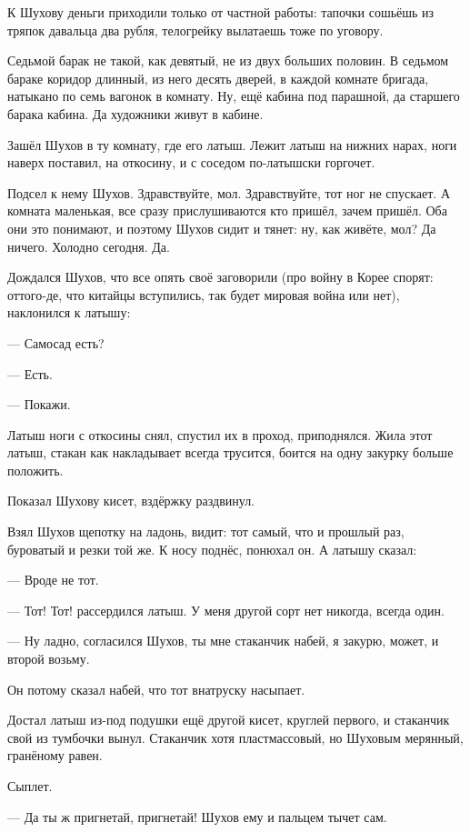 К Шухову деньги приходили только от частной работы: тапочки сошьёшь из тряпок давальца \dash
два рубля, телогрейку вылатаешь \dash тоже по уговору.

Седьмой барак не такой, как девятый, не из двух больших половин. В седьмом бараке коридор
длинный, из него десять дверей, в каждой комнате бригада, натыкано по семь вагонок в комнату.
Ну, ещё кабина под парашной, да старшего барака кабина. Да художники живут в кабине.

Зашёл Шухов в ту комнату, где его латыш. Лежит латыш на нижних нарах, ноги наверх поставил, на
откосину, и с соседом по-латышски горгочет.

Подсел к нему Шухов. Здравствуйте, мол. Здравствуйте, тот ног не спускает. А комната
маленькая, все сразу прислушиваются \dash кто пришёл, зачем пришёл. Оба они это понимают, и
поэтому Шухов сидит и тянет: ну, как живёте, мол? Да ничего. Холодно сегодня. Да.

Дождался Шухов, что все опять своё заговорили (про войну в Корее спорят: оттого-де, что
китайцы вступились, так будет мировая война или нет), наклонился к латышу:

--- Самосад есть?

--- Есть.

--- Покажи.

Латыш ноги с откосины снял, спустил их в проход, приподнялся. Жила этот латыш, стакан как
накладывает \dash всегда трусится, боится на одну закурку больше положить.

Показал Шухову кисет, вздёржку раздвинул.

Взял Шухов щепотку на ладонь, видит: тот самый, что и прошлый раз, буроватый и резки той же. К
носу поднёс, понюхал \dash он. А латышу сказал:

--- Вроде не тот.

--- Тот! Тот! \dash рассердился латыш. \Dash У меня другой сорт нет никогда, всегда один.

--- Ну ладно, \dash согласился Шухов, \Dash ты мне стаканчик набей, я закурю, может, и второй возьму.

Он потому сказал набей, что тот внатруску насыпает.

Достал латыш из-под подушки ещё другой кисет, круглей первого, и стаканчик свой из тумбочки
вынул. Стаканчик хотя пластмассовый, но Шуховым мерянный, гранёному равен.

Сыплет.

--- Да ты ж пригнетай, пригнетай! \dash Шухов ему и пальцем тычет сам.

